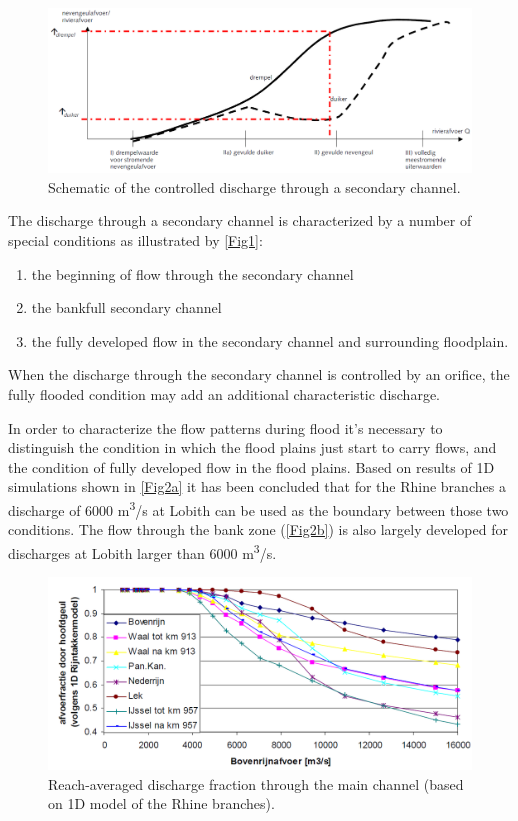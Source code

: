 \begin{figure}
\includegraphics[width=\columnwidth]{figures/Fig1.png}
\caption{Schematic of the controlled discharge through a secondary channel.}
\label{Fig1}
\end{figure}

The discharge through a secondary channel is characterized by a number of special conditions as illustrated by \autoref{Fig1}:

\begin{enumerate}
\item the beginning of flow through the secondary channel
\item the bankfull secondary channel
\item the fully developed flow in the secondary channel and surrounding floodplain.
\end{enumerate}

When the discharge through the secondary channel is controlled by an orifice, the fully flooded condition may add an additional characteristic discharge.

In order to characterize the flow patterns during flood it's necessary to distinguish the condition in which the flood plains just start to carry flows, and the condition of fully developed flow in the flood plains.
Based on results of 1D simulations shown in \autoref{Fig2a} it has been concluded that for the Rhine branches a discharge of 6000 m\textsuperscript{3}/s at Lobith can be used as the boundary between those two conditions.
The flow through the bank zone (\autoref{Fig2b}) is also largely developed for discharges at Lobith larger than
6000 m\textsuperscript{3}/s.

\begin{figure}
\includegraphics[width=\columnwidth]{figures/Fig2a.png}
\caption{Reach-averaged discharge fraction through the main channel (based on 1D model of the Rhine branches).}
\label{Fig2a}
\end{figure}

